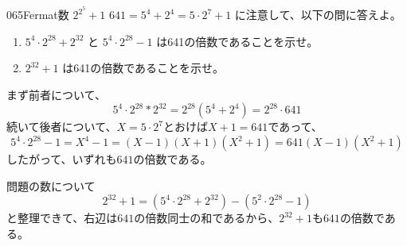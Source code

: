 \begin{thm}{065}{}{Fermat数 $2^{2^5}+1$}
 $641=5^4+2^4=5\cdot 2^7 +1$ に注意して、以下の問に答えよ。
 \begin{enumerate}
  \item $5^4\cdot 2^{28}+2^{32}$ と $5^4\cdot 2^{28} -1$ は641の倍数であることを示せ。
  \item $2^{32}+1$ は641の倍数であることを示せ。
 \end{enumerate}
\end{thm}

まず前者について、
\[ 5^4\cdot 2^{28}*2^{32}=2^{28}(5^4+2^4)=2^{28}\cdot 641 \]
続いて後者について、$X=5\cdot 2^7$とおけば$X+1=641$であって、
\[ 5^4\cdot2^{28}-1=X^4-1=(X-1)(X+1)(X^2+1)=641(X-1)(X^2+1) \]
したがって、いずれも$641$の倍数である。

問題の数について
\[ 2^{32}+1=(5^4\cdot 2^{28}+2^{32})-(5^2\cdot 2^{28}-1) \]
と整理できて、右辺は$641$の倍数同士の和であるから、$2^{32}+1$も$641$の倍数である。